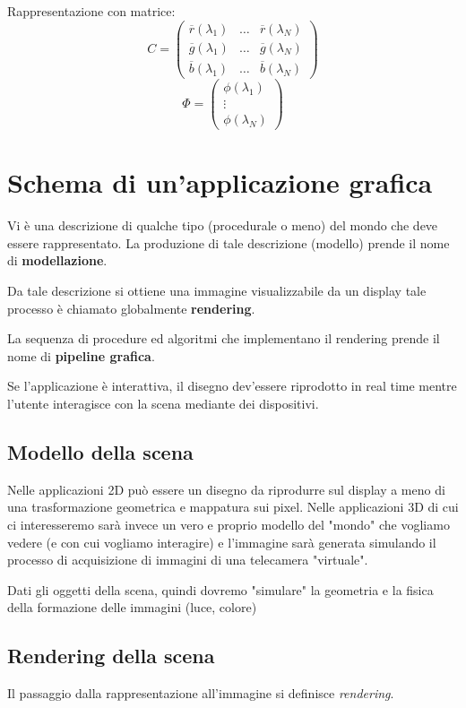 \documentclass[a4paper, 10pt]{article}
\begin{document}
			Rappresentazione con matrice:
			\[
			C =
			\begin{pmatrix}
			\overline{r} (\lambda_1) & \dots & \overline{r}(\lambda_N) \\
			\overline{g} (\lambda_1) & \dots & \overline{g}(\lambda_N) \\
			\overline{b} (\lambda_1) & \dots & \overline{b}(\lambda_N) 
			\end{pmatrix}
			\]
			\[
			\Phi =
			\begin{pmatrix}
			\phi(\lambda_1)\\
			\vdots \\
			\phi (\lambda_N) 
			\end{pmatrix}
			\]
			
	\section{Schema di un'applicazione grafica}
		Vi è una descrizione di qualche tipo (procedurale o meno) del
		mondo che deve essere rappresentato. La produzione di tale
		descrizione (modello) prende il nome di \textbf{modellazione}.
		
		\noindent
		Da tale descrizione si ottiene una immagine visualizzabile da
		un display tale processo è chiamato globalmente \textbf{rendering}.
		
		\noindent
		La sequenza di procedure ed algoritmi che implementano il
		rendering prende il nome di \textbf{pipeline grafica}.
		
		\noindent
		Se l'applicazione è interattiva, il disegno dev'essere riprodotto
		in real time mentre l'utente interagisce con la scena mediante
		dei dispositivi.
			
	\subsection{Modello della scena}
		Nelle applicazioni 2D può essere un disegno da riprodurre sul
		display a meno di una trasformazione geometrica e mappatura
		sui pixel.
		Nelle applicazioni 3D di cui ci interesseremo sarà invece un
		vero e proprio modello del "mondo" che vogliamo vedere (e
		con cui vogliamo interagire) e l'immagine sarà generata
		simulando il processo di acquisizione di immagini di una
		telecamera "virtuale".
		
		\noindent
		Dati gli oggetti della scena, quindi dovremo "simulare" la geometria
		e la fisica della formazione delle immagini (luce, colore)
		
	\subsection{Rendering della scena}
		Il passaggio dalla rappresentazione all'immagine si definisce
		\textit{rendering}.
		
\end{document}
